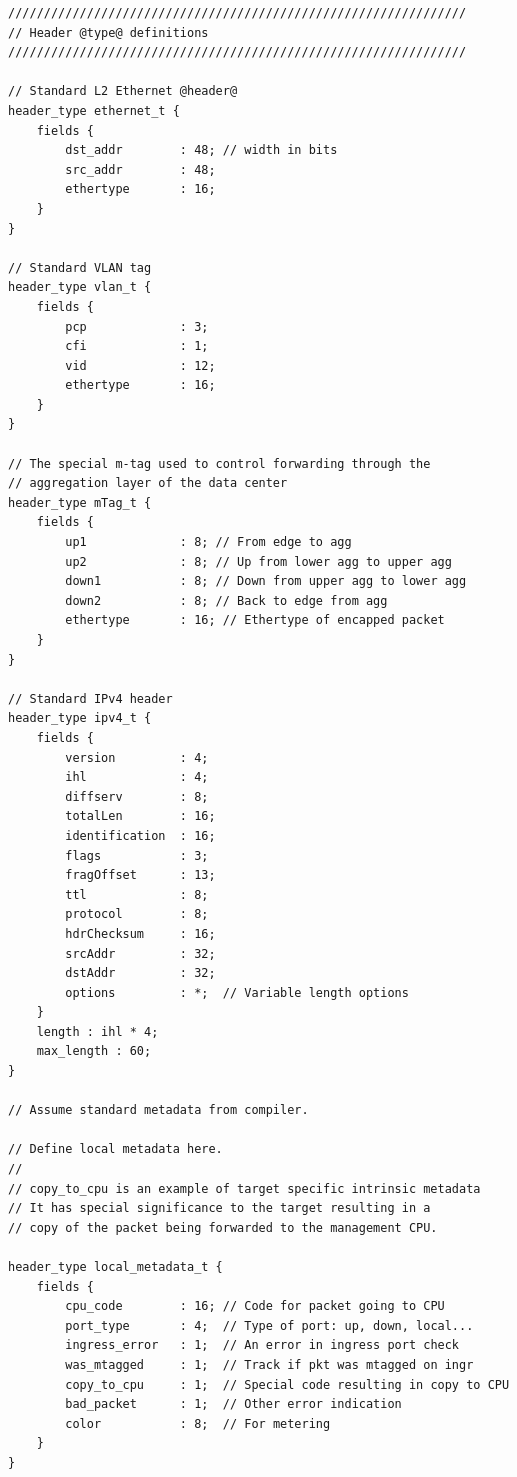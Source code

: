 \documentclass[12pt]{article}
\begin{document}
\begin{lstlisting}[keywords={},frame=single,escapechar=\@]
////////////////////////////////////////////////////////////////
// Header @type@ definitions
////////////////////////////////////////////////////////////////

// Standard L2 Ethernet @header@
header_type ethernet_t {
    fields {
        dst_addr        : 48; // width in bits
        src_addr        : 48;
        ethertype       : 16;
    }
}

// Standard VLAN tag
header_type vlan_t {
    fields {
        pcp             : 3;
        cfi             : 1;
        vid             : 12;
        ethertype       : 16;
    }
}

// The special m-tag used to control forwarding through the
// aggregation layer of the data center
header_type mTag_t {
    fields {
        up1             : 8; // From edge to agg
        up2             : 8; // Up from lower agg to upper agg
        down1           : 8; // Down from upper agg to lower agg
        down2           : 8; // Back to edge from agg
        ethertype       : 16; // Ethertype of encapped packet
    }
}

// Standard IPv4 header
header_type ipv4_t {
    fields {
        version         : 4;
        ihl             : 4;
        diffserv        : 8;
        totalLen        : 16;
        identification  : 16;
        flags           : 3;
        fragOffset      : 13;
        ttl             : 8;
        protocol        : 8;
        hdrChecksum     : 16;
        srcAddr         : 32;
        dstAddr         : 32;
        options         : *;  // Variable length options
    }
    length : ihl * 4;
    max_length : 60;
}

// Assume standard metadata from compiler.

// Define local metadata here.
//
// copy_to_cpu is an example of target specific intrinsic metadata
// It has special significance to the target resulting in a
// copy of the packet being forwarded to the management CPU.

header_type local_metadata_t {
    fields {
        cpu_code        : 16; // Code for packet going to CPU
        port_type       : 4;  // Type of port: up, down, local...
        ingress_error   : 1;  // An error in ingress port check
        was_mtagged     : 1;  // Track if pkt was mtagged on ingr
        copy_to_cpu     : 1;  // Special code resulting in copy to CPU
        bad_packet      : 1;  // Other error indication
        color           : 8;  // For metering
    }
}
\end{lstlisting}
\end{document}
